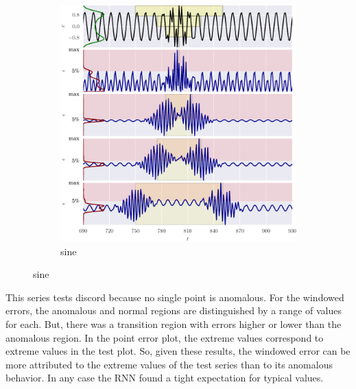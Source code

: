 \begin{figure}[!hp]
    \ContinuedFloat 
  
    \begin{subfigure}[t]{\textwidth}
        \centering
        \includegraphics[]{figs/er_sin.pdf}
        \caption{sine}
    \end{subfigure}%

\end{figure}

This series tests discord because no single point is anomalous.
%
For the windowed errors, the anomalous and normal regions are distinguished by a range of values for each.
%
But, there was a transition region with errors higher or lower than the anomalous region.
%
In the point error plot, the extreme values correspond to extreme values in the test plot.
%
So, given these results, the windowed error can be more attributed to the extreme values of the test series than to its anomalous behavior.
%
In any case the RNN found a tight expectation for typical values.


